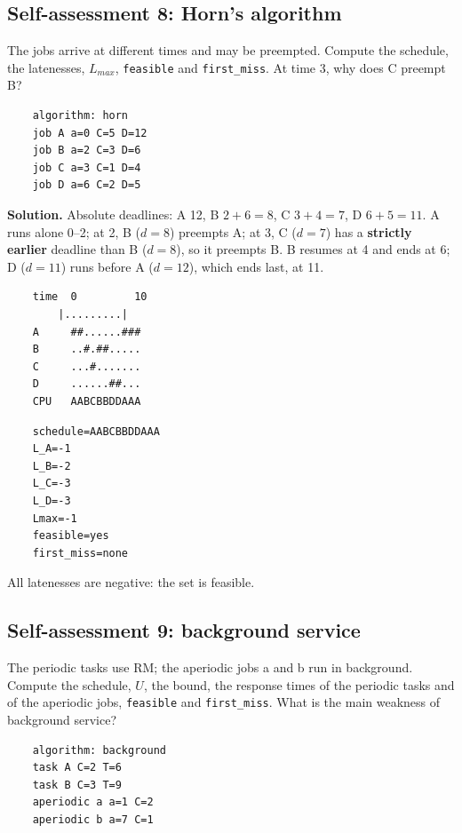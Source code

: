 \subsection*{Self-assessment 8: Horn's algorithm}
The jobs arrive at different times and may be preempted. Compute the schedule, the latenesses, $L_{max}$, \texttt{feasible} and \texttt{first\_miss}. At time 3, why does C preempt B?
\begin{lstlisting}
    algorithm: horn
    job A a=0 C=5 D=12
    job B a=2 C=3 D=6
    job C a=3 C=1 D=4
    job D a=6 C=2 D=5
\end{lstlisting}

\textbf{Solution.} Absolute deadlines: A 12, B $2 + 6 = 8$, C $3 + 4 = 7$, D $6 + 5 = 11$. A runs alone 0--2; at 2, B ($d = 8$) preempts A; at 3, C ($d = 7$) has a \textbf{strictly earlier} deadline than B ($d = 8$), so it preempts B. B resumes at 4 and ends at 6; D ($d = 11$) runs before A ($d = 12$), which ends last, at 11.
\begin{verbatim}
    time  0         10
        |.........|
    A     ##......###
    B     ..#.##.....
    C     ...#.......
    D     ......##...
    CPU   AABCBBDDAAA
\end{verbatim}
\begin{verbatim}
    schedule=AABCBBDDAAA
    L_A=-1
    L_B=-2
    L_C=-3
    L_D=-3
    Lmax=-1
    feasible=yes
    first_miss=none
\end{verbatim}
All latenesses are negative: the set is feasible.

\subsection*{Self-assessment 9: background service}
The periodic tasks use RM; the aperiodic jobs a and b run in background. Compute the schedule, $U$, the bound, the response times of the periodic tasks and of the aperiodic jobs, \texttt{feasible} and \texttt{first\_miss}. What is the main weakness of background service?
\begin{lstlisting}
    algorithm: background
    task A C=2 T=6
    task B C=3 T=9
    aperiodic a a=1 C=2
    aperiodic b a=7 C=1
\end{lstlisting}

